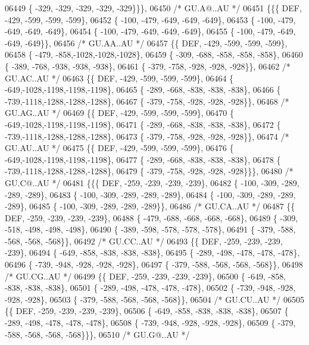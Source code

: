 \begin{DoxyCode}
06449 \{ -329, -329, -329, -329, -329\}\}\},
06450 \textcolor{comment}{/* GU.A@..AU */}
06451 \{\{\{  DEF, -429, -599, -599, -599\},
06452 \{ -100, -479, -649, -649, -649\},
06453 \{ -100, -479, -649, -649, -649\},
06454 \{ -100, -479, -649, -649, -649\},
06455 \{ -100, -479, -649, -649, -649\}\},
06456 \textcolor{comment}{/* GU.AA..AU */}
06457 \{\{  DEF, -429, -599, -599, -599\},
06458 \{ -479, -858,-1028,-1028,-1028\},
06459 \{ -309, -688, -858, -858, -858\},
06460 \{ -389, -768, -938, -938, -938\},
06461 \{ -379, -758, -928, -928, -928\}\},
06462 \textcolor{comment}{/* GU.AC..AU */}
06463 \{\{  DEF, -429, -599, -599, -599\},
06464 \{ -649,-1028,-1198,-1198,-1198\},
06465 \{ -289, -668, -838, -838, -838\},
06466 \{ -739,-1118,-1288,-1288,-1288\},
06467 \{ -379, -758, -928, -928, -928\}\},
06468 \textcolor{comment}{/* GU.AG..AU */}
06469 \{\{  DEF, -429, -599, -599, -599\},
06470 \{ -649,-1028,-1198,-1198,-1198\},
06471 \{ -289, -668, -838, -838, -838\},
06472 \{ -739,-1118,-1288,-1288,-1288\},
06473 \{ -379, -758, -928, -928, -928\}\},
06474 \textcolor{comment}{/* GU.AU..AU */}
06475 \{\{  DEF, -429, -599, -599, -599\},
06476 \{ -649,-1028,-1198,-1198,-1198\},
06477 \{ -289, -668, -838, -838, -838\},
06478 \{ -739,-1118,-1288,-1288,-1288\},
06479 \{ -379, -758, -928, -928, -928\}\}\},
06480 \textcolor{comment}{/* GU.C@..AU */}
06481 \{\{\{  DEF, -259, -239, -239, -239\},
06482 \{ -100, -309, -289, -289, -289\},
06483 \{ -100, -309, -289, -289, -289\},
06484 \{ -100, -309, -289, -289, -289\},
06485 \{ -100, -309, -289, -289, -289\}\},
06486 \textcolor{comment}{/* GU.CA..AU */}
06487 \{\{  DEF, -259, -239, -239, -239\},
06488 \{ -479, -688, -668, -668, -668\},
06489 \{ -309, -518, -498, -498, -498\},
06490 \{ -389, -598, -578, -578, -578\},
06491 \{ -379, -588, -568, -568, -568\}\},
06492 \textcolor{comment}{/* GU.CC..AU */}
06493 \{\{  DEF, -259, -239, -239, -239\},
06494 \{ -649, -858, -838, -838, -838\},
06495 \{ -289, -498, -478, -478, -478\},
06496 \{ -739, -948, -928, -928, -928\},
06497 \{ -379, -588, -568, -568, -568\}\},
06498 \textcolor{comment}{/* GU.CG..AU */}
06499 \{\{  DEF, -259, -239, -239, -239\},
06500 \{ -649, -858, -838, -838, -838\},
06501 \{ -289, -498, -478, -478, -478\},
06502 \{ -739, -948, -928, -928, -928\},
06503 \{ -379, -588, -568, -568, -568\}\},
06504 \textcolor{comment}{/* GU.CU..AU */}
06505 \{\{  DEF, -259, -239, -239, -239\},
06506 \{ -649, -858, -838, -838, -838\},
06507 \{ -289, -498, -478, -478, -478\},
06508 \{ -739, -948, -928, -928, -928\},
06509 \{ -379, -588, -568, -568, -568\}\}\},
06510 \textcolor{comment}{/* GU.G@..AU */}

\end{DoxyCode}
